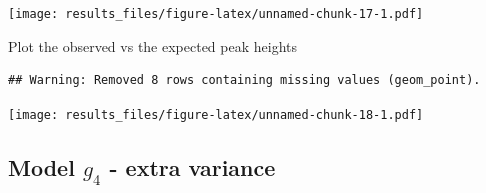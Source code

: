 \documentclass[]{article}
\newenvironment{Shaded}{\begin{snugshade}}{\end{snugshade}}
\newcommand{\DataTypeTok}[1]{\textcolor[rgb]{0.13,0.29,0.53}{#1}}
\newcommand{\DecValTok}[1]{\textcolor[rgb]{0.00,0.00,0.81}{#1}}
\newcommand{\KeywordTok}[1]{\textcolor[rgb]{0.13,0.29,0.53}{\textbf{#1}}}
\newcommand{\NormalTok}[1]{#1}
\newcommand{\OperatorTok}[1]{\textcolor[rgb]{0.81,0.36,0.00}{\textbf{#1}}}
\newcommand{\StringTok}[1]{\textcolor[rgb]{0.31,0.60,0.02}{#1}}
\begin{document}
\texttt{[image: results\_files/figure-latex/unnamed-chunk-17-1.pdf]}

Plot the observed vs the expected peak heights

\begin{Shaded}
\end{Shaded}

\begin{verbatim}
## Warning: Removed 8 rows containing missing values (geom_point).
\end{verbatim}

\texttt{[image: results\_files/figure-latex/unnamed-chunk-18-1.pdf]}

\hypertarget{model-g_4---extra-variance}{%
\subsection{\texorpdfstring{Model \(g_4\) - extra
variance}{Model g\_4 - extra variance}}\label{model-g_4---extra-variance}}
\end{document}
